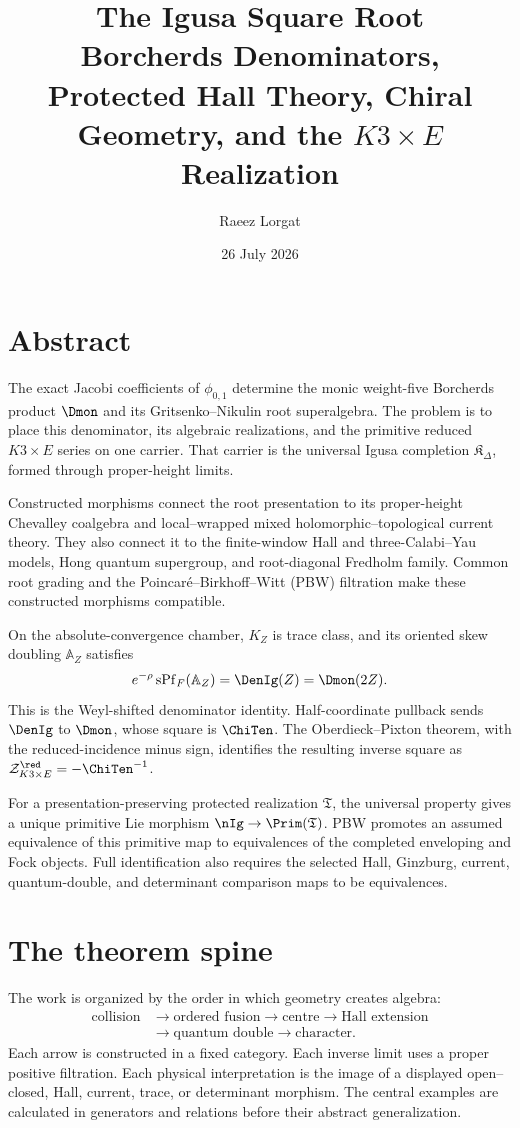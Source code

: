 \documentclass[11pt,twoside,openright]{memoir}
\title{\texorpdfstring{\textbf{The Igusa Square Root}\\[0.55em]\Large Borcherds Denominators, Protected Hall Theory, Chiral Geometry, and the $K3\times E$ Realization}{The Igusa Square Root: Borcherds Denominators, Protected Hall Theory, Chiral Geometry, and the K3 x E Realization}}
\author{Raeez Lorgat}
\date{26 July 2026}
\begin{document}
\frontmatter
\maketitle
\thispagestyle{empty}
\cleardoublepage
\chapter*{Abstract}

The exact Jacobi coefficients of $\phi_{0,1}$ determine the monic weight-five Borcherds product $\Dmon$ and its Gritsenko--Nikulin root superalgebra.  The problem is to place this denominator, its algebraic realizations, and the primitive reduced $K3\times E$ series on one carrier.  That carrier is the universal Igusa completion $\mathfrak K_\Delta$, formed through proper-height limits.

Constructed morphisms connect the root presentation to its proper-height Chevalley coalgebra and local--wrapped mixed holomorphic--topological current theory.  They also connect it to the finite-window Hall and three-Calabi--Yau models, Hong quantum supergroup, and root-diagonal Fredholm family.  Common root grading and the Poincar\'e--Birkhoff--Witt (PBW) filtration make these constructed morphisms compatible.

On the absolute-convergence chamber, $K_Z$ is trace class, and its oriented skew doubling $\mathbb A_Z$ satisfies
\[
 e^{-\rho}\operatorname{sPf}_F(\mathbb A_Z)=\DenIg(Z)=\Dmon(2Z).
\]
This is the Weyl-shifted denominator identity.  Half-coordinate pullback sends $\DenIg$ to $\Dmon$, whose square is $\ChiTen$.  The Oberdieck--Pixton theorem, with the reduced-incidence minus sign, identifies the resulting inverse square as $\mathcal Z^{\red}_{K3\times E}=-\ChiTen^{-1}$.

For a presentation-preserving protected realization $\mathfrak T$, the universal property gives a unique primitive Lie morphism $\nIg\to\Prim(\mathfrak T)$.  PBW promotes an assumed equivalence of this primitive map to equivalences of the completed enveloping and Fock objects.  Full identification also requires the selected Hall, Ginzburg, current, quantum-double, and determinant comparison maps to be equivalences.


\chapter*{The theorem spine}
The work is organized by the order in which geometry creates algebra:
\[
\begin{aligned}
\text{collision}&\longrightarrow\text{ordered fusion}\longrightarrow\text{centre}\longrightarrow\text{Hall extension}\\
&\longrightarrow\text{quantum double}\longrightarrow\text{character}.
\end{aligned}
\]
Each arrow is constructed in a fixed category.  Each inverse limit uses a proper positive filtration.  Each physical interpretation is the image of a displayed open--closed, Hall, current, trace, or determinant morphism.  The central examples are calculated in generators and relations before their abstract generalization.
\end{document}
